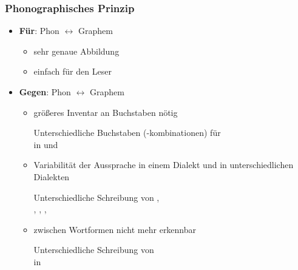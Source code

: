 \begin{frame}
\frametitle{Phonographisches Prinzip}

\begin{itemize}
	
	\item \textbf{Für}: Phon $\leftrightarrow$ Graphem

	\begin{itemize}
		\item sehr genaue Abbildung
		\item einfach für den Leser
	\end{itemize}

\pause 
	
	\item \textbf{Gegen}: Phon $\leftrightarrow$ Graphem
	
	\begin{itemize}
		\item größeres Inventar an Buchstaben nötig
		
		\ea Unterschiedliche Buchstaben (-kombinationen) für \\
		\zB in  und 
		\z 

\pause 		

		\item Variabilität der Aussprache in einem Dialekt und in unterschiedlichen Dialekten
		
		\ea Unterschiedliche Schreibung von ,\\
		\zB {}, , , 
		\z 

\pause 
		
		\item {} zwischen Wortformen nicht mehr erkennbar
		
		\ea Unterschiedliche Schreibung von \\
		\zB in  \vs {}
		\z 
	\end{itemize}
\end{itemize}

\end{frame}


